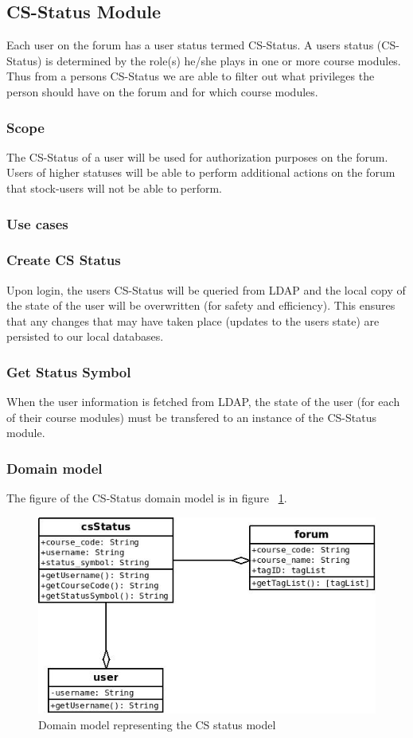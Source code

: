 \subsection{CS-Status Module}
\par{Each user on the forum has a user status termed CS-Status. A users status (CS-Status) is determined by the role(s) he/she plays in one or more course modules. Thus from a persons CS-Status we are able to filter out what privileges the person should have on the forum and for which course modules.}
\subsubsection{Scope}
\par{The CS-Status of a user will be used for authorization purposes on the forum. Users of higher statuses will be able to perform additional actions on the forum that stock-users will not be able to perform.}
\subsubsection{Use cases}
\subsubsection*{Create CS Status}
\par{Upon login, the users CS-Status will be queried from LDAP and the local copy of the state of the user will be overwritten (for safety and efficiency). This ensures that any changes that may have taken place (updates to the users state) are persisted to our local databases.}
\subsubsection*{Get Status Symbol}
\par{When the user information is fetched from LDAP, the state of the user (for each of their course modules) must be transfered to an instance of the CS-Status module.}
\subsubsection{Domain model}
\par{The figure of the CS-Status domain model is in figure ~\ref{fig:cs}.}
\begin{figure}[h!]
\includegraphics[width=\linewidth]{Diagrams/csStatus_domain_model.jpeg}
\caption{Domain model representing the CS status model}
\label{fig:cs}
\end{figure}
